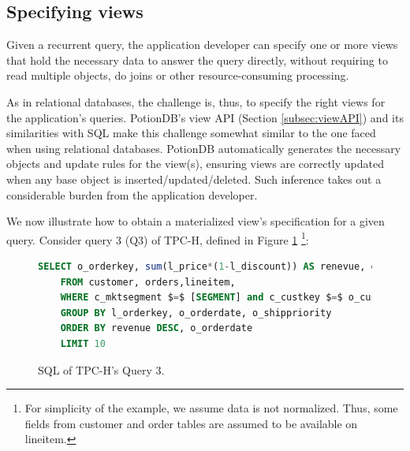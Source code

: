 \documentclass[sigconf, nonacm]{acmart}
\begin{document}
\subsection{Specifying views}
\label{subsec:views_for_queries}

Given a recurrent query, the application developer can specify one or more views that hold the necessary data 
to answer the query directly, without requiring to read multiple objects, do joins or other resource-consuming processing.

As in relational databases, the challenge is, thus, to specify the right views for the application's queries.
PotionDB's view API (Section \ref{subsec:viewAPI}) and its similarities with SQL make this challenge somewhat similar to the one faced when using relational databases.
PotionDB automatically generates the necessary objects and update rules for the view(s), ensuring views are correctly updated when any base object is inserted/updated/deleted.
Such inference takes out a considerable burden from the application developer.

We now illustrate how to obtain a materialized view’s specification for a given query. 
Consider query 3 (Q3) of TPC-H, defined in Figure \ref{fig:q3}
\footnote{For simplicity of the example, we assume data is not normalized. Thus, some fields from customer and order tables are assumed to be available on lineitem.}:

\begin{figure}[h]
	\begin{lstlisting}[language=SQL]
	SELECT o_orderkey, sum(l_price*(1-l_discount)) AS renevue, o_orderdate, o_shippriority
	FROM customer, orders,lineitem,
	WHERE c_mktsegment $=$ [SEGMENT] and c_custkey $=$ o_custkey and o_orderkey $=$ l_orderkey and o_orderdate $<$ [DATE] and l_shipdate $>$ [DATE]
	GROUP BY l_orderkey, o_orderdate, o_shippriority
	ORDER BY revenue DESC, o_orderdate
	LIMIT 10
	\end{lstlisting}
\caption{SQL of TPC-H's Query 3.}
\label{fig:q3}
\end{figure}

\end{document}
